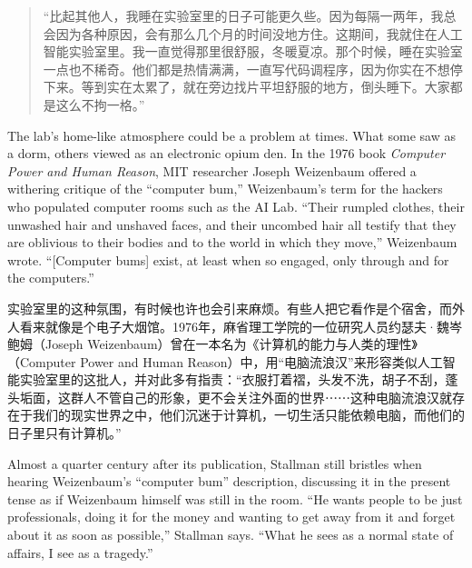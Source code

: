 \ifdefined\chs
\begin{quote}
“比起其他人，我睡在实验室里的日子可能更久些。因为每隔一两年，我总会因为各种原因，会有那么几个月的时间没地方住。这期间，我就住在人工智能实验室里。我一直觉得那里很舒服，冬暖夏凉。那个时候，睡在实验室一点也不稀奇。他们都是热情满满，一直写代码调程序，因为你实在不想停下来。等到实在太累了，就在旁边找片平坦舒服的地方，倒头睡下。大家都是这么不拘一格。”
\end{quote}
\fi

\ifdefined\eng
The lab's home-like atmosphere could be a problem at times. What some saw as a dorm, others viewed as an electronic opium den. In the 1976 book \textit{Computer Power and Human Reason}, MIT researcher Joseph Weizenbaum offered a withering critique of the ``computer bum,'' Weizenbaum's term for the hackers who populated computer rooms such as the AI Lab. ``Their rumpled clothes, their unwashed hair and unshaved faces, and their uncombed hair all testify that they are oblivious to their bodies and to the world in which they move,'' Weizenbaum wrote. ``[Computer bums] exist, at least when so engaged, only through and for the computers.''
\fi

\ifdefined\chs
实验室里的这种氛围，有时候也许也会引来麻烦。有些人把它看作是个宿舍，而外人看来就像是个电子大烟馆。1976年，麻省理工学院的一位研究人员约瑟夫·魏岑鲍姆（Joseph Weizenbaum）曾在一本名为《计算机的能力与人类的理性》（Computer Power and Human Reason）中，用“电脑流浪汉”来形容类似人工智能实验室里的这批人，并对此多有指责：“衣服打着褶，头发不洗，胡子不刮，蓬头垢面，这群人不管自己的形象，更不会关注外面的世界⋯⋯这种电脑流浪汉就存在于我们的现实世界之中，他们沉迷于计算机，一切生活只能依赖电脑，而他们的日子里只有计算机。”
\fi

\ifdefined\eng
Almost a quarter century after its publication, Stallman still bristles when hearing Weizenbaum's ``computer bum'' description, discussing it in the present tense as if Weizenbaum himself was still in the room. ``He wants people to be just professionals, doing it for the money and wanting to get away from it and forget about it as soon as possible,'' Stallman says. ``What he sees as a normal state of affairs, I see as a tragedy.''
\fi

